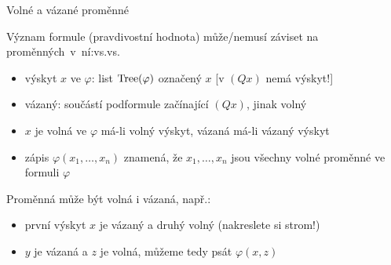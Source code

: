 \documentclass{beamer}
\begin{document}
\begin{frame}{Volné a vázané proměnné}

    Význam formule (\alert{pravdivostní hodnota}) může/nemusí záviset na proměnných~v~ní:vs.vs.

    \begin{itemize}
        \item \alert{výskyt $x$ ve $\varphi$:} list $\operatorname{Tree}(\varphi)$ označený $x$ [v $(Qx)$ nemá výskyt!]
        \item \alert{vázaný}: součástí podformule začínající $(Qx)$, jinak \alert{volný}
        \item $x$ je \alert{volná} ve $\varphi$ má-li volný výskyt, \alert{vázaná} má-li vázaný výskyt
        \item zápis \alert{$\varphi(x_1,\dots,x_n)$} znamená, že $x_1,\dots,x_n$ jsou všechny volné proměnné ve formuli $\varphi$
    \end{itemize}

    Proměnná může být \alert{volná i vázaná}, např.:

    \begin{itemize}
        \item první výskyt $x$ je vázaný a druhý volný (nakreslete si strom!) 
        \item $y$ je vázaná a $z$ je volná, můžeme tedy psát $\varphi(x,z)$
    \end{itemize}

\end{frame}
\end{document}
